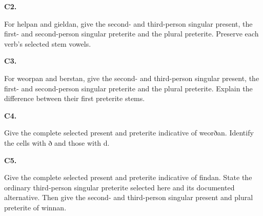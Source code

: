 \par\begin{minipage}{\linewidth}\raggedright
\textbf{C2.}

For helpan and gieldan, give the second- and third-person singular present, the first- and second-person singular preterite and the plural preterite. Preserve each verb’s selected stem vowels.

\end{minipage}\par\addvspace{4pt}

\par\begin{minipage}{\linewidth}\raggedright
\textbf{C3.}

For weorpan and berstan, give the second- and third-person singular present, the first- and second-person singular preterite and the plural preterite. Explain the difference between their first preterite stems.

\end{minipage}\par\addvspace{4pt}

\par\begin{minipage}{\linewidth}\raggedright
\textbf{C4.}

Give the complete selected present and preterite indicative of weorðan. Identify the cells with ð and those with d.

\end{minipage}\par\addvspace{4pt}

\par\begin{minipage}{\linewidth}\raggedright
\textbf{C5.}

Give the complete selected present and preterite indicative of findan. State the ordinary third-person singular preterite selected here and its documented alternative. Then give the second- and third-person singular present and plural preterite of winnan.

\end{minipage}\par\addvspace{4pt}

